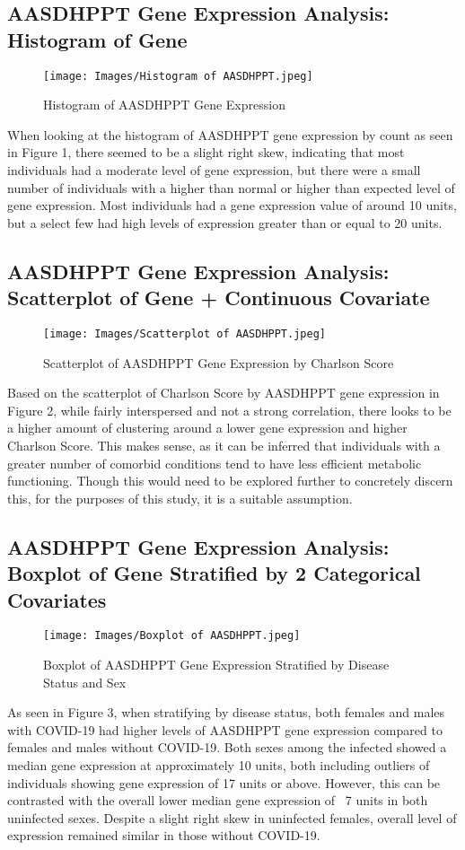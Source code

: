 \documentclass{article}
\begin{document}
\newpage
\subsection{AASDHPPT Gene Expression Analysis: Histogram of Gene}
\begin{figure}[hbt!]
    \centering
    \texttt{[image: Images/Histogram of AASDHPPT.jpeg]}
    \caption{Histogram of AASDHPPT Gene Expression}
    \label{Histogram of AASDHPPT}
\end{figure}
When looking at the histogram of AASDHPPT gene expression by count as seen in Figure 1, there seemed to be a slight right skew, indicating that most individuals had a moderate level of gene expression, but there were a small number of individuals with a higher than normal or higher than expected level of gene expression. Most individuals had a gene expression value of around 10 units, but a select few had high levels of expression greater than or equal to 20 units.

\newpage
\subsection{AASDHPPT Gene Expression Analysis: Scatterplot of Gene + Continuous Covariate}
\begin{figure}[hbt!]
    \centering
    \texttt{[image: Images/Scatterplot of AASDHPPT.jpeg]}
    \caption{Scatterplot of AASDHPPT Gene Expression by Charlson Score}
    \label{Scatterplot of AASDHPPT}
\end{figure}
Based on the scatterplot of Charlson Score by AASDHPPT gene expression in Figure 2, while fairly interspersed and not a strong correlation, there looks to be a higher amount of clustering around a lower gene expression and higher Charlson Score. This makes sense, as it can be inferred that individuals with a greater number of comorbid conditions tend to have less efficient metabolic functioning. Though this would need to be explored further to concretely discern this, for the purposes of this study, it is a suitable assumption.

\newpage
\subsection{AASDHPPT Gene Expression Analysis: Boxplot of Gene Stratified by 2 Categorical Covariates}
\begin{figure}[hbt!]
    \centering
    \texttt{[image: Images/Boxplot of AASDHPPT.jpeg]}
    \caption{Boxplot of AASDHPPT Gene Expression Stratified by Disease Status and Sex}
    \label{Boxplot of AASDHPPT}
\end{figure}
As seen in Figure 3, when stratifying by disease status, both females and males with COVID-19 had higher levels of AASDHPPT gene expression compared to females and males without COVID-19. Both sexes among the infected showed a median gene expression at approximately 10 units, both including outliers of individuals showing gene expression of 17 units or above. However, this can be contrasted with the overall lower median gene expression of ~7 units in both uninfected sexes. Despite a slight right skew in uninfected females, overall level of expression remained similar in those without COVID-19. 
\end{document}

